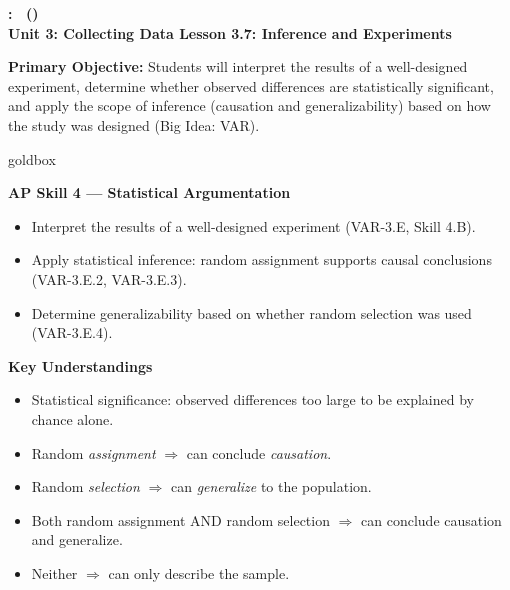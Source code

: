 \documentclass[10pt]{article}
\newcommand{\UnitNumberName}{Unit 3: Collecting Data \quad}
\newcommand{\LessonNumberName}{Lesson 3.7: Inference and Experiments}
\begin{document}
\begin{center}
    {\Large\bfseries \CourseName: \SchoolYear\ (\MeetingLength) \\
    {\small\bfseries \UnitNumberName \LessonNumberName}}
\end{center}

\begin{tcolorbox}[colback=sky, colframe=navy, boxrule=0.9pt, arc=2mm,
    left=2mm, right=2mm, top=1.5mm, bottom=1.5mm]
    \textbf{Primary Objective:} Students will interpret the results of a well-designed
    experiment, determine whether observed differences are statistically significant,
    and apply the scope of inference (causation and generalizability) based on how
    the study was designed (Big Idea: VAR).
\end{tcolorbox}

\renewcommand{\arraystretch}{1.6}
\begin{skillbox}{goldbox}
\begin{minipage}[t]{0.48\linewidth}
    \textbf{AP Skill 4 --- Statistical Argumentation}
    \begin{itemize}
        \item Interpret the results of a well-designed experiment (VAR-3.E, Skill 4.B).
        \item Apply statistical inference: random assignment supports causal conclusions
              (VAR-3.E.2, VAR-3.E.3).
        \item Determine generalizability based on whether random selection was used
              (VAR-3.E.4).
    \end{itemize}
\end{minipage}
\hfill
\begin{minipage}[t]{0.48\linewidth}
    \textbf{Key Understandings}
    \begin{itemize}
        \item Statistical significance: observed differences too large to be explained
              by chance alone.
        \item Random \emph{assignment} $\Rightarrow$ can conclude \emph{causation}.
        \item Random \emph{selection} $\Rightarrow$ can \emph{generalize} to the
              population.
        \item Both random assignment AND random selection $\Rightarrow$ can conclude
              causation and generalize.
        \item Neither $\Rightarrow$ can only describe the sample.
    \end{itemize}
\end{minipage}
\end{skillbox}
\end{document}
